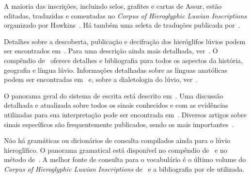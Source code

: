\documentclass[article]{lúvio}
\begin{document}
A maioria das inscrições, incluindo selos, grafites e cartas de Assur, estão
editadas, traduzidas e comentadas no \emph{Corpus of Hieroglyphic Luwian
	Inscriptions} organizado por Hawkins~\cite{CHLI11,CHLI12,CHLI13,CHLI2,CHLI3}.
Há também uma seleta de traduções publicada por~\textcite{Payne2012}.

Detalhes sobre a descoberta, publicação e decifração dos hieróglifos lúvios
podem ser encontrados em~\textcite[pp. 131ff.]{HawkinsScripts}. Para uma descrição
ainda mais detalhada, ver~\textcite[pp. 6-17]{CHLI11}.
O compêndio de~\textcite{Melchert2003} oferece detalhes e bibliografia para todos
os aspectos da história, geografia e língua lúvio.
Informações detalhadas sobre as línguas anatólicas podem ser encontradas
em~\textcite[239--308]{HSK41.1} e, sobre a dialetologia do lúvio,
ver~\textcite{Yakubovich2010}.

O panorama geral do sistema de escrita está descrito
em~\textcite[p. 155ff.]{HawkinsScripts}.
Uma discussão detalhada e atualizada sobre todos os sinais conhecidos e com
as evidências utilizadas para sua interpretação pode ser encontrada
em~\textcite[354--488]{CHLI3}.
Diversos artigos sobre sinais específicos são frequentemente publicados, sendo
os mais
importantes~\textcite{HawkinsMorpurgoNeumann1974,Rieken2008,RiekenYakubovich2010}.

Não há gramáticas ou dicionários de consulta compilados ainda para o lúvio
hieroglífico.
O panorama gramatical está disponível no compêndio de~\textcite{Melchert2003} e no
método de~\textcite{Payne2010}.
A melhor fonte de consulta para o vocabulário é o último volume do \emph{Corpus
	of Hieroglyphic Luwian Inscriptions} de~\textcite{CHLI13} e a bibliografia por ele
utilizada.


\renewcommand*{\mkbibnamefamily}[1]{\textsc{#1}}
\printbibliography%
\end{document}
